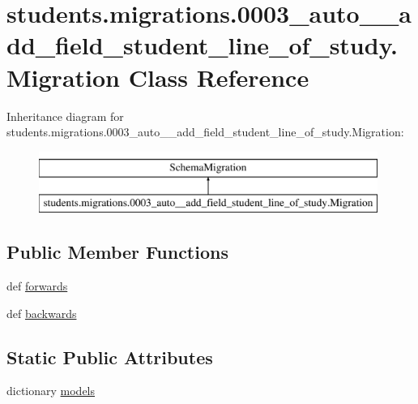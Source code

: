 \hypertarget{classstudents_1_1migrations_1_10003__auto____add__field__student__line__of__study_1_1_migration}{\section{students.\-migrations.0003\-\_\-auto\-\_\-\-\_\-add\-\_\-field\-\_\-student\-\_\-line\-\_\-of\-\_\-study.Migration Class Reference}
\label{classstudents_1_1migrations_1_10003__auto____add__field__student__line__of__study_1_1_migration}
}
Inheritance diagram for students.\-migrations.0003\-\_\-auto\-\_\-\-\_\-add\-\_\-field\-\_\-student\-\_\-line\-\_\-of\-\_\-study.Migration\-:\begin{figure}[H]
\begin{center}
\leavevmode
\includegraphics[height=2.000000cm]{classstudents_1_1migrations_1_10003__auto____add__field__student__line__of__study_1_1_migration}
\end{center}
\end{figure}
\subsection*{Public Member Functions}
\begin{DoxyCompactItemize}
\item 
def \hyperlink{classstudents_1_1migrations_1_10003__auto____add__field__student__line__of__study_1_1_migration_a94a867dd97a643482e02f5e9598f213f}{forwards}
\item 
def \hyperlink{classstudents_1_1migrations_1_10003__auto____add__field__student__line__of__study_1_1_migration_af6244739d0541193d6658b834716c9ea}{backwards}
\end{DoxyCompactItemize}
\subsection*{Static Public Attributes}
\begin{DoxyCompactItemize}
\item 
dictionary \hyperlink{classstudents_1_1migrations_1_10003__auto____add__field__student__line__of__study_1_1_migration_a1656f729c63dfbc632ab6070a4d7a813}{models}
\end{DoxyCompactItemize}


